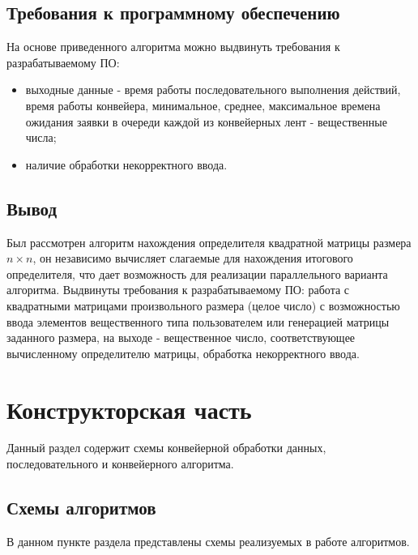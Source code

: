 \documentclass[a4paper,oneside,14pt]{extreport}
\begin{document}
\section{Требования к программному обеспечению}
На основе приведенного алгоритма можно выдвинуть требования к разрабатываемому ПО:
\begin{itemize}
	\item выходные данные - время работы последовательного выполнения действий, время работы конвейера, минимальное, среднее, максимальное времена ожидания заявки в очереди каждой из конвейерных лент - вещественные числа;
	\item наличие обработки некорректного ввода.
\end{itemize}

\section{Вывод}
Был рассмотрен алгоритм нахождения определителя квадратной матрицы размера $n \times n$, он независимо вычисляет слагаемые
для нахождения итогового определителя, что дает возможность для реализации параллельного варианта алгоритма. Выдвинуты требования к разрабатываемому ПО: работа с квадратными матрицами произвольного размера (целое число) с возможностью ввода элементов вещественного типа пользователем или генерацией матрицы заданного размера, на выходе - вещественное число, соответствующее вычисленному определителю матрицы, обработка некорректного ввода.
\newpage

\chapter{Конструкторская часть}
Данный раздел содержит схемы конвейерной обработки данных, последовательного и конвейерного алгоритма.

\section{Схемы алгоритмов}
В данном пункте раздела представлены схемы реализуемых в работе алгоритмов.
\end{document}
